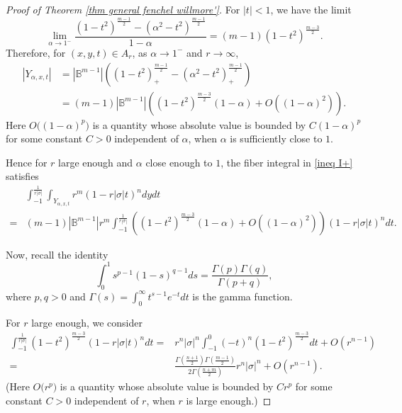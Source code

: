 \documentclass[11pt, reqno]{amsart}
\numberwithin{equation}{section}
\begin{document}
\begin{proof}[Proof of Theorem \ref{thm general fenchel willmore'}]
For $|t|<1$, we have the limit
$$
\lim_{\alpha \rightarrow 1^{-}} \frac{\left(1-t^2\right)^{\frac{m-1}{2}} -\left(\alpha^2-t^2\right)^{\frac{m-1}{2}} }{1-\alpha}=(m-1) \left(1-t^2\right)^{\frac{m-3}{2}}.
$$
Therefore, for $(x, y, t) \in A_r$, as $\alpha\to 1^-$ and $r\to\infty$,
\begin{align*}
\left|Y_{\alpha, x, t}\right| & =\left|\mathbb{B}^{m-1}\right|\left(\left(1 -t^2\right)_{+}^{\frac{m-1}{2}}-\left(\alpha^2 -t^2\right)_{+}^{\frac{m-1}{2}}\right) \\
& =(m-1)\left|\mathbb{B}^{m-1}\right|\left(\left(1-t^2\right)^{\frac{m-3}{2}}(1-\alpha)+O\left((1-\alpha)^2\right)\right).
\end{align*}
Here $O\bigl((1-\alpha)^p\bigr)$ is a quantity whose absolute value is bounded by $C (1-\alpha)^p$ for some constant $C > 0$ independent of $\alpha$, when $\alpha$ is sufficiently close to $1$.

Hence for $r$ large enough and $\alpha$ close enough to $1$, the fiber integral in \eqref{ineq I+} satisfies
\begin{equation}\label{ineq I+2}
\begin{aligned}
& \int_{-1}^{\frac{1}{r|\sigma|}} \int_{Y_{\alpha, x, t}} r^m(1-r|\sigma| t)^n d y d t\\
=& (m-1)\left|\mathbb{B}^{m-1}\right|r^m
\int_{-1}^{\frac{1}{r|\sigma|}} \left(\left(1-t^2\right)^{\frac{m-3}{2}}(1-\alpha)+O\left((1-\alpha)^2\right)\right)(1-r|\sigma| t)^n d t.
\end{aligned}
\end{equation}

Now, recall the identity \cite[Eqn. (13.45), (13.49)]{ArfkenWeberHarris2013}
\begin{equation}\label{eq euler}
\int_0^1 s^{p-1}(1-s)^{q-1} d s=\frac{\Gamma(p) \Gamma(q)}{\Gamma(p+q)},
\end{equation}
where $p, q>0$ and $\Gamma(s)=\int_0^{\infty} t^{s-1} e^{-t} d t$ is the gamma function.

For $r$ large enough, we consider
\begin{equation}\label{ineq I+3}
\begin{aligned}
\int_{-1}^{\frac{1}{r|\sigma|}} \left(1-t^2\right)^{\frac{m-3}{2}} (1-r|\sigma| t)^n d t
=& r^n|\sigma|^n \int_{-1}^0(-t)^n\left(1-t^2\right)^{\frac{m-3}{2}} d t+O\left(r^{n-1}\right)\\
=& \frac{\Gamma\left(\frac{n+1}{2}\right) \Gamma\left(\frac{m-1}{2}\right)}{2\Gamma\left(\frac{n+m}{2}\right)} r^n|\sigma|^n+O\left(r^{n-1}\right).
\end{aligned}
\end{equation}
(Here $O\bigl(r^p\bigr)$ is a quantity whose absolute value is bounded by $C r^p$ for some constant $C > 0$ independent of $r$, when $r$ is large enough.)


\end{proof}
\end{document}

